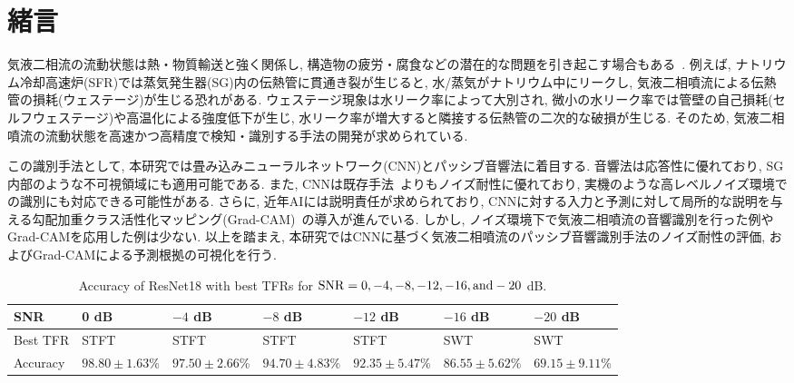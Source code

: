 \documentclass[10pt, fleqn, twocolumn]{jsarticle}
\begin{document}

\section{緒言}
気液二相流の流動状態は熱・物質輸送と強く関係し, 構造物の疲労・腐食などの潜在的な問題を引き起こす場合もある~\cite{Yao2019}.
例えば, ナトリウム冷却高速炉(SFR)では蒸気発生器(SG)内の伝熱管に貫通き裂が生じると, 水/蒸気がナトリウム中にリークし, 気液二相噴流による伝熱管の損耗(ウェステージ)が生じる恐れがある.
ウェステージ現象は水リーク率によって大別され, 微小の水リーク率では管壁の自己損耗(セルフウェステージ)や高温化による強度低下が生じ, 水リーク率が増大すると隣接する伝熱管の二次的な破損が生じる.
そのため, 気液二相噴流の流動状態を高速かつ高精度で検知・識別する手法の開発が求められている.

この識別手法として, 本研究では畳み込みニューラルネットワーク(CNN)とパッシブ音響法に着目する.
音響法は応答性に優れており, SG内部のような不可視領域にも適用可能である.
また, CNNは既存手法~\cite{Mikami2023a}よりもノイズ耐性に優れており, 実機のような高レベルノイズ環境での識別にも対応できる可能性がある.
さらに, 近年AIには説明責任が求められており, CNNに対する入力と予測に対して局所的な説明を与える勾配加重クラス活性化マッピング(Grad-CAM)~\cite{Selvaraju2017}の導入が進んでいる.
しかし, ノイズ環境下で気液二相噴流の音響識別を行った例やGrad-CAMを応用した例は少ない.
以上を踏まえ, 本研究ではCNNに基づく気液二相噴流のパッシブ音響識別手法のノイズ耐性の評価, およびGrad-CAMによる予測根拠の可視化を行う.

\begin{table}[b]
  \centering
  \caption{Accuracy of ResNet18 with best TFRs for ${\rm SNR}=0,-4,-8,-12,-16,{\rm and}-20$ dB.}
  \label{tab:accuracy_of_resnet18}
  \begin{tabularx}{\textwidth}{X|XXXXXX}
    \hline
    SNR & 0 dB & $-4$ dB & $-8$ dB & $-12$ dB & $-16$ dB & $-20$ dB \\
    \hline
    Best TFR & STFT & STFT & STFT & STFT & SWT & SWT \\
    Accuracy & $98.80\pm1.63$\% & $97.50\pm2.66$\% & $94.70\pm4.83\%$ & $92.35\pm5.47$\% & $86.55\pm5.62$\% & $69.15\pm9.11$\% \\
    \hline
  \end{tabularx}
\end{table}
\end{document}
